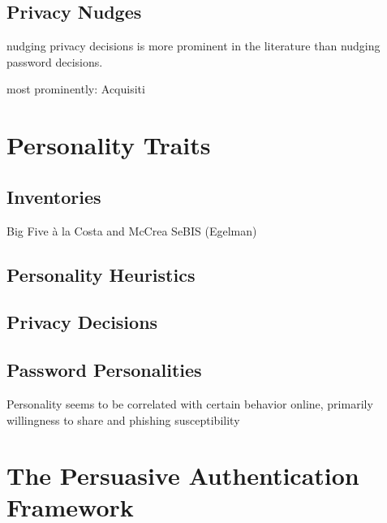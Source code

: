 	\subsection{Privacy Nudges}
	nudging privacy decisions is more prominent in the literature than nudging password decisions. 
	
	most prominently: Acquisiti \etal \cite{Acquisti2017NudgesPrivacySecurity} \cite{Acquisti2005PrivacyRationality}

\section{Personality Traits}
	\subsection{Inventories}
	Big Five à la Costa and McCrea \cite{Costa1992NEO}
	SeBIS (Egelman)
	\subsection{Personality Heuristics}	
	\subsection{Privacy Decisions}
	\subsection{Password Personalities}
	
	
	Personality seems to be correlated with certain behavior online, primarily willingness to share and phishing susceptibility \cite{Halevi2013PilotStudyPersonality}

\section{The Persuasive Authentication Framework}


